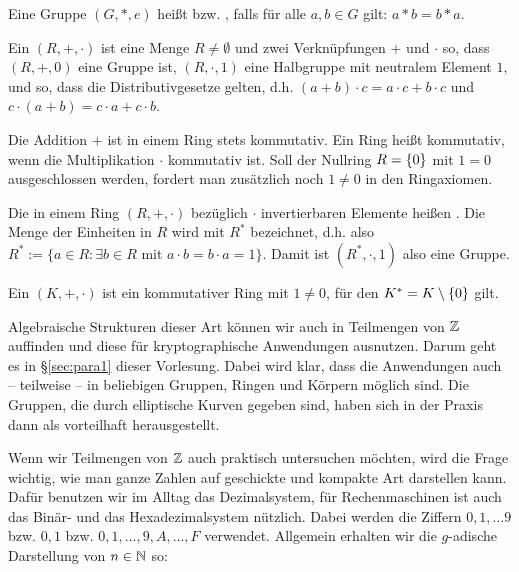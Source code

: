 \begin{defn}
	Eine Gruppe $(G,*,e)$ heißt  bzw. , falls für alle $a, b \in G$ gilt: $a * b = b*a$. 
\end{defn}

\begin{defn}[Ring]
	Ein  $(R,+,\cdot)$  ist eine Menge $R \neq \emptyset$ und zwei Verknüpfungen $+$ und $\cdot$ so, dass $(R,+,0)$ eine Gruppe ist, $(R,\cdot,1)$ eine Halbgruppe mit neutralem Element $1$, und so, dass die Distributivgesetze gelten, d.h. $(a+b) \cdot c = a \cdot c + b \cdot c$ und $c \cdot (a+b) = c \cdot a + c \cdot b$.
\end{defn}

\begin{bem}
	Die Addition $+$ ist in einem Ring stets kommutativ. Ein Ring heißt kommutativ, wenn die Multiplikation $\cdot$ kommutativ ist. Soll der Nullring $R = \{0\}$ mit $1 = 0$ ausgeschlossen werden, fordert man zusätzlich noch $1 \neq 0$ in den Ringaxiomen.
\end{bem}

\begin{defn}
	Die in einem Ring $(R,+,\cdot)$ bezüglich $\cdot$ invertierbaren Elemente heißen . Die Menge der Einheiten in $R$ wird mit $R^*$ bezeichnet, d.h. also $R^* := \{a \in R : \exists b \in R \text{ mit } a \cdot b = b \cdot a = 1\}$. Damit ist $(R^*,\cdot,1)$ also eine Gruppe. 
\end{defn}

\begin{defn}[Körper]
	Ein  $(K,+,\cdot)$ ist ein kommutativer Ring mit $1 \neq 0$, für den $K^* = K \setminus \{0\}$ gilt.
\end{defn}

Algebraische Strukturen dieser Art können wir auch in Teilmengen von $\mathbb{Z}$ auffinden und diese für kryptographische Anwendungen ausnutzen. Darum geht es in §\ref{sec:para1} dieser Vorlesung. Dabei wird klar, dass die Anwendungen auch -- teilweise -- in beliebigen Gruppen, Ringen und Körpern möglich sind. Die Gruppen, die durch elliptische Kurven gegeben sind, haben sich in der Praxis dann als vorteilhaft herausgestellt.

Wenn wir Teilmengen von $\mathbb{Z}$ auch praktisch untersuchen möchten, wird die Frage wichtig, wie man ganze Zahlen auf geschickte und kompakte Art darstellen kann. Dafür benutzen wir im Alltag das Dezimalsystem, für Rechenmaschinen ist auch das Binär- und das Hexadezimalsystem nützlich. Dabei werden die Ziffern $0,1,\dots 9$ bzw. $0,1$ bzw. $0,1,\dots, 9, A, \dots, F$ verwendet. Allgemein erhalten wir die $g$-adische Darstellung von $n \in \mathbb{N}$ so:

